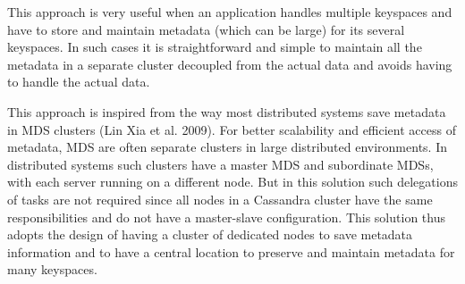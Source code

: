 This  approach is very useful when an application handles multiple keyspaces
and have to store and maintain metadata (which can be large) for its several
keyspaces. 
In such cases it is straightforward and simple to maintain all the metadata  in a
separate cluster  decoupled from the actual data and avoids having to handle
the actual data. 
 
 This approach is inspired from the way most distributed systems
 save metadata in \ac{MDS} clusters (Lin Xia et al.  2009). 
 For better scalability and efficient access of metadata,  \ac{MDS} are
 often separate clusters in large distributed environments.  In distributed
 systems such clusters  have a master \ac{MDS} and subordinate \acp{MDS},  with
 each server running on a different node.  But in this solution such delegations
 of tasks are not required since all nodes in a Cassandra cluster  have the same
 responsibilities and do not have a master-slave configuration.  This solution
 thus adopts the design of having a cluster of dedicated nodes to save metadata
 information and to have a central location to preserve and maintain metadata
 for many keyspaces. 
 